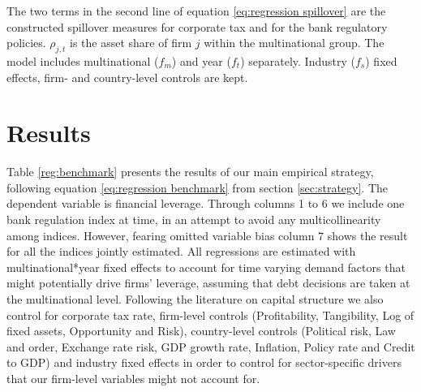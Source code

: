 \documentclass[12pt]{article}
\begin{document}
  The two terms in the second line of equation \ref{eq:regression spillover} are the constructed spillover measures for corporate tax and for the bank regulatory policies. $\rho_{j,t}$ is the asset share of firm $j$ within the multinational group. The model includes multinational ($f_{m}$) and year ($f_{t}$) separately. Industry ($f_s$) fixed effects, firm- and country-level controls are kept. 
	 
	\section{Results} \label{sec:result}
	 Table \ref{reg:benchmark} presents the results of our main empirical strategy, following equation \ref{eq:regression benchmark} from section \ref{sec:strategy}. The dependent variable is financial leverage. Through columns 1 to 6 we include one bank regulation index at time, in an attempt to avoid any multicollinearity among indices. However, fearing omitted variable bias column 7 shows the result for all the indices jointly estimated. All regressions are estimated with multinational*year fixed effects to account for time varying demand factors that might potentially drive firms' leverage, assuming that debt decisions are taken at the multinational level. Following the literature on capital structure we also control for corporate tax rate, firm-level controls (Profitability, Tangibility, Log of fixed assets, Opportunity and Risk), country-level controls (Political risk, Law and order, Exchange rate risk, GDP growth rate, Inflation, Policy rate and Credit to GDP) and industry fixed effects in order to control for sector-specific drivers that our firm-level variables might not account for.
	 
\end{document}
